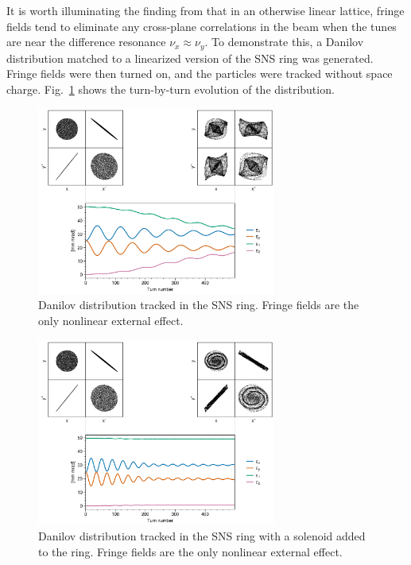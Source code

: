 It is worth illuminating the finding from \cite{Holmes2018} that in an otherwise linear lattice, fringe fields tend to eliminate any cross-plane correlations in the beam when the tunes are near the difference resonance $\nu_x \approx \nu_y$. To demonstrate this, a Danilov distribution matched to a linearized version of the SNS ring was generated. Fringe fields were then turned on, and the particles were tracked without space charge. Fig.~\ref{fig:fringe_a} shows the turn-by-turn evolution of the distribution.
%
\begin{figure}[!p]
    \centering
    \includegraphics[width=0.7\textwidth]{Images/chapter3/fringe.png}
    \caption{Danilov distribution tracked in the SNS ring. Fringe fields are the only nonlinear external effect.}
    \label{fig:fringe_a}
    \vspace*{3cm}
\end{figure}
%
%
\begin{figure}[!p]
    \centering
    \includegraphics[width=0.7\textwidth]{Images/chapter3/fringe_solenoid.png}
    \caption{Danilov distribution tracked in the SNS ring with a solenoid added to the ring. Fringe fields are the only nonlinear external effect.}
    \label{fig:fringe_b}
    \vspace*{3cm}
\end{figure}
